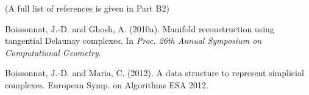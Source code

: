 % 
% 


\vspace{4mm}

\ind \sind (A full list of references is given in Part B2)

\vspace{-12.8mm}

\begin{thebibliography}{}





\vspace{-2.4mm}

{\small %
Boissonnat, J.-D. and Ghosh, A. (2010a).
\newblock Manifold reconstruction using tangential {Delaunay} complexes.
\newblock In {\em Proc. 26th Annual Symposium on Computational Geometry}.

\vspace{-2.4mm}



Boissonnat, J.-D. and Maria, C. (2012).
\newblock A data structure to represent simplicial complexes.
\newblock European Symp. on Algorithms ESA 2012.
\vspace{-2.4mm}

}
\end{thebibliography}
